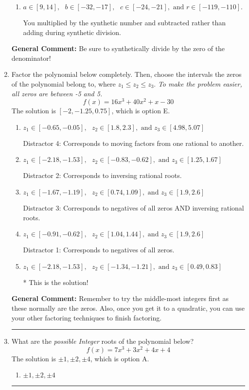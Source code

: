 \documentclass{extbook}[14pt]
\newcommand{\litem}[1]{\item #1

\rule{\textwidth}{0.4pt}}
\begin{document}
\begin{enumerate}
{\begin{enumerate}[label=\Alph*.]
 You multiplied by the synthetic number rather than bringing the first factor down.
\item \( a \in [9, 14], \text{   } b \in [-32, -17], \text{   } c \in [-24, -21], \text{   and   } r \in [-119, -110]. \)

 You multiplied by the synthetic number and subtracted rather than adding during synthetic division.
\end{enumerate}

\textbf{General Comment:} Be sure to synthetically divide by the zero of the denominator!
}
\litem{
Factor the polynomial below completely. Then, choose the intervals the zeros of the polynomial belong to, where $z_1 \leq z_2 \leq z_3$. \textit{To make the problem easier, all zeros are between -5 and 5.}
\[ f(x) = 16x^{3} +40 x^{2} +x -30 \]The solution is \( [-2, -1.25, 0.75] \), which is option E.\begin{enumerate}[label=\Alph*.]
\item \( z_1 \in [-0.65, -0.05], \text{   }  z_2 \in [1.8, 2.3], \text{   and   } z_3 \in [4.98, 5.07] \)

 Distractor 4: Corresponds to moving factors from one rational to another.
\item \( z_1 \in [-2.18, -1.53], \text{   }  z_2 \in [-0.83, -0.62], \text{   and   } z_3 \in [1.25, 1.67] \)

 Distractor 2: Corresponds to inversing rational roots.
\item \( z_1 \in [-1.67, -1.19], \text{   }  z_2 \in [0.74, 1.09], \text{   and   } z_3 \in [1.9, 2.6] \)

 Distractor 3: Corresponds to negatives of all zeros AND inversing rational roots.
\item \( z_1 \in [-0.91, -0.62], \text{   }  z_2 \in [1.04, 1.44], \text{   and   } z_3 \in [1.9, 2.6] \)

 Distractor 1: Corresponds to negatives of all zeros.
\item \( z_1 \in [-2.18, -1.53], \text{   }  z_2 \in [-1.34, -1.21], \text{   and   } z_3 \in [0.49, 0.83] \)

* This is the solution!
\end{enumerate}

\textbf{General Comment:} Remember to try the middle-most integers first as these normally are the zeros. Also, once you get it to a quadratic, you can use your other factoring techniques to finish factoring.
}
\litem{
What are the \textit{possible Integer} roots of the polynomial below?
\[ f(x) = 7x^{3} +3 x^{2} +4 x + 4 \]The solution is \( \pm 1,\pm 2,\pm 4 \), which is option A.\begin{enumerate}[label=\Alph*.]
\item \( \pm 1,\pm 2,\pm 4 \)


\end{enumerate}}
\end{enumerate}
\end{document}
